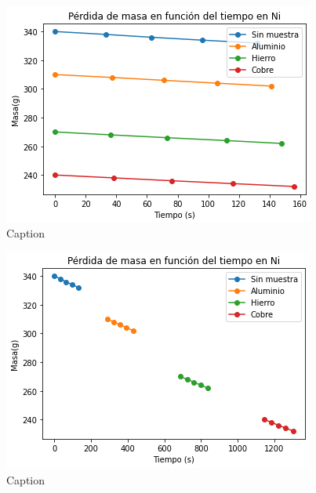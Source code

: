 \begin{figure}
    \centering
    \includegraphics[scale=0.8]{img/nitro.png}
    \caption{Caption}
    \label{fig:my_label}
\end{figure}
\begin{figure}
    \centering
    \includegraphics[scale=0.8]{img/nitro2.png}
    \caption{Caption}
    \label{fig:my_label}
\end{figure}